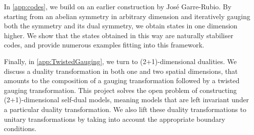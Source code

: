 In \cref{app:codes}, we build on an earlier construction by Jos\'e Garre-Rubio. By starting from an abelian symmetry in arbitrary dimension and iteratively gauging both the symmetry and its dual symmetry, we obtain states in one dimension higher. We show that the states obtained in this way are naturally stabiliser codes, and provide numerous examples fitting into this framework.

Finally, in \cref{app:TwistedGauging}, we turn to (2+1)-dimensional dualities. We discuss a duality transformation in both one and two spatial dimensions, that amounts to the composition of a gauging transformation followed by a twisted gauging transformation. This project solves the open problem of constructing (2+1)-dimensional self-dual models, meaning models that are left invariant under a particular duality transformation. We also lift these duality transformations to unitary transformations by taking into account the appropriate boundary conditions.